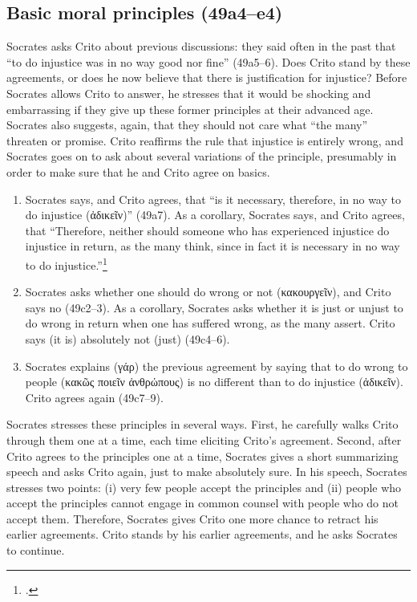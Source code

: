 \documentclass[12pt,letterpaper]{article}
\begin{document}
\subsection*{Basic moral principles (49a4--e4)}

Socrates asks Crito about previous discussions: they said often in the past that ``to do injustice was in no way good nor fine'' (49a5--6). Does Crito stand by these agreements, or does he now believe that there is justification for injustice? Before Socrates allows Crito to answer, he stresses that it would be shocking and embarrassing if they give up these former principles at their advanced age. Socrates also suggests, again, that they should not care what ``the many'' threaten or promise. Crito reaffirms the rule that injustice is entirely wrong, and Socrates goes on to ask about several variations of the principle, presumably in order to make sure that he and Crito agree on basics.

\begin{enumerate}
    \item Socrates says, and Crito agrees, that ``is it necessary, therefore, in no way to do injustice (\textgreek{ἀδικεῖν})'' (49a7). As a corollary, Socrates says, and Crito agrees, that ``Therefore, neither should someone who has experienced injustice do injustice in return, as the many think, since in fact it is necessary in no way to do injustice.''\footcite[I call the second claim a ``corollary'' following][25--26]{kraut-socrates-state-1984}
    \item Socrates asks whether one should do wrong or not (\textgreek{κακουργεῖν}), and Crito says no (49c2--3). As a corollary, Socrates asks whether it is just or unjust to do wrong in return when one has suffered wrong, as the many assert. Crito says (it is) absolutely not (just) (49c4--6).
    \item Socrates explains (\textgreek{γάρ}) the previous agreement by saying that to do wrong to people (\textgreek{κακῶς ποιεῖν ἀνθρώπους}) is no different than to do injustice (\textgreek{ἀδικεῖν}). Crito agrees again (49c7--9).
\end{enumerate}

Socrates stresses these principles in several ways. First, he carefully walks Crito through them one at a time, each time eliciting Crito's agreement. Second, after Crito agrees to the principles one at a time, Socrates gives a short summarizing speech and asks Crito again, just to make absolutely sure. In his speech, Socrates stresses two points: (i) very few people accept the principles and (ii) people who accept the principles cannot engage in common counsel with people who do not accept them. Therefore, Socrates gives Crito one more chance to retract his earlier agreements. Crito stands by his earlier agreements, and he asks Socrates to continue.
\end{document}
